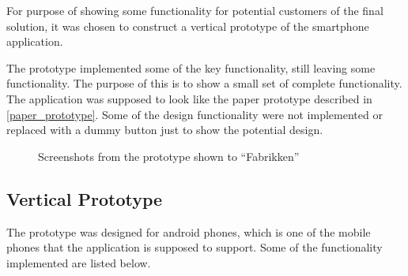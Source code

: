 For purpose of showing some functionality for potential customers of the final solution, it was chosen to construct a vertical prototype of the smartphone application.

The prototype implemented some of the key functionality, still leaving some functionality. The purpose of this is to show a small set of complete functionality. The application was supposed to look like the paper prototype described in \cref{paper_prototype}. Some of the design functionality were not implemented or replaced with a dummy button just to show the potential design.

\begin{figure}[hbtp]
  \centering
  \caption{Screenshots from the prototype shown to \enquote{Fabrikken}}
\end{figure}

\subsection{Vertical Prototype}
\label{sub:vertical_prototype}
The prototype was designed for android phones, which is one of the mobile phones that the application is supposed to support. Some of the functionality implemented are listed below.

